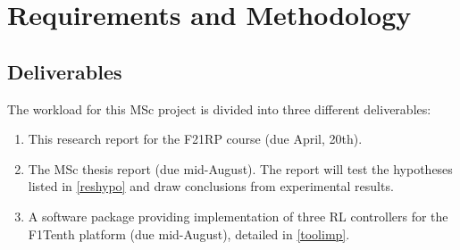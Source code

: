 
\chapter{Requirements and Methodology} %

\label{Chapter3} %



\section{Deliverables}
\label{deliv}

The workload for this MSc project is divided into three different deliverables:

\begin{enumerate}
	\item This research report for the F21RP course (due April, 20th).
	\item The MSc thesis report (due mid-August). The report will test the hypotheses listed in \ref{reshypo} and draw conclusions from experimental results.
	\item A software package providing implementation of three RL controllers for the F1Tenth platform (due mid-August), detailed in \ref{toolimp}.
\end{enumerate}


